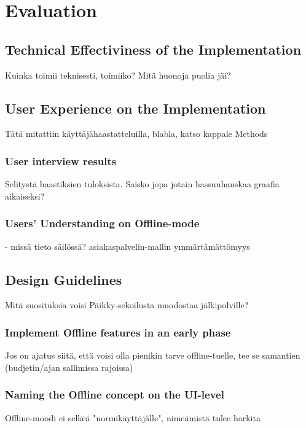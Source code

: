 
\chapter{Evaluation}

\section{Technical Effectiviness of the Implementation}
Kuinka toimii teknisesti, toimiiko? Mitä huonoja puolia jäi?



\section{User Experience on the Implementation}
Tätä mitattiin käyttäjähaastatteluilla, blabla, katso kappale Methods

\subsection{User interview results}
Selitystä haastiksien tuloksista. Saisko jopa jotain hassunhauskaa graafia aikaiseksi?



\subsection{Users' Understanding on Offline-mode}
- missä tieto säilössä? asiakaspalvelin-mallin ymmärtämättömyys




\section{Design Guidelines}
Mitä suosituksia voisi Päikky-sekoilusta muodostaa jälkipolville?

\subsection{Implement Offline features in an early phase}
Jos on ajatus siitä, että voisi olla pienikin tarve offline-tuelle, tee se samantien (budjetin/ajan sallimissa rajoissa)

\subsection{Naming the Offline concept on the UI-level}
Offline-moodi ei selkeä "normikäyttäjälle", nimeämistä tulee harkita
